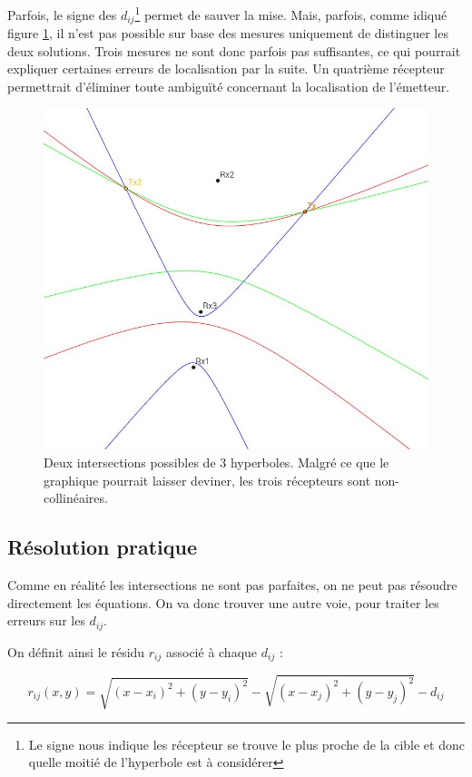 \documentclass[10pt,a4paper]{article}
\begin{document}
Parfois, le signe des $d_{ij}$\footnote{Le signe nous indique les récepteur se trouve le plus proche de la cible et donc quelle moitié de l'hyperbole est à considérer} permet de sauver la mise. Mais, parfois, comme idiqué figure \ref{int}, il n'est pas possible sur base des mesures uniquement de distinguer les deux solutions. Trois mesures ne sont donc parfois pas suffisantes, ce qui pourrait expliquer certaines erreurs de localisation par la suite. Un quatrième récepteur permettrait d'éliminer toute ambiguïté concernant la localisation de l'émetteur.

\begin{figure}[h]
\centering
\includegraphics[scale = 0.5]{hyperbole}
\caption{Deux intersections possibles de 3 hyperboles. Malgré ce que le graphique pourrait laisser deviner, les trois récepteurs sont non-collinéaires.}
\label{int}
\end{figure}

\subsection{Résolution pratique}
Comme en réalité les intersections ne sont pas parfaites, on ne peut pas résoudre directement les équations. On va donc trouver une autre voie, pour traiter les erreurs sur les $d_{ij}$.

On définit ainsi le résidu $r_{ij}$ associé à chaque $d_{ij}$ : 

\begin{equation}
r_{ij}(x,y) = \sqrt{(x-x_i)^2 + (y-y_i)^2} - \sqrt{(x-x_j)^2 + (y-y_j)^2} - d_{ij}
\end{equation}
\end{document}
